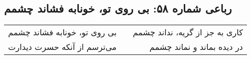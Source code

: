 \begin{center}
\section*{رباعی شماره ۵۸: بی روی تو، خونابه فشاند چشمم}
\label{sec:058}
\begin{longtable}{l p{0.5cm} r}
بی روی تو، خونابه فشاند چشمم
&&
کاری به جز از گریه، نداند چشمم
\\
می‌ترسم از آنکه حسرت دیدارت
&&
در دیده بماند و نماند چشمم
\\
\end{longtable}
\end{center}
